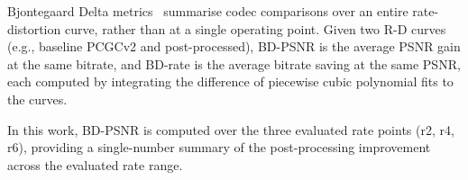 Bjontegaard Delta metrics~\cite{bjontegaard2001calculation} summarise codec
comparisons over an entire rate-distortion curve, rather than at a single
operating point.
Given two R-D curves (e.g., baseline PCGCv2 and post-processed),
BD-PSNR is the average PSNR gain at the same bitrate, and BD-rate is the
average bitrate saving at the same PSNR, each computed by integrating the
difference of piecewise cubic polynomial fits to the curves.

In this work, BD-PSNR is computed over the three evaluated rate points
(r2, r4, r6), providing a single-number summary of the post-processing
improvement across the evaluated rate range.
